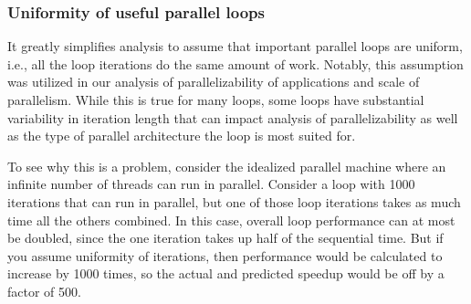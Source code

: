 \documentclass[12pt,twoside]{reedthesis}
\begin{document}
		
		
		
		
		
		

		
		\subsubsection{Uniformity of useful parallel loops}
		
		It greatly simplifies analysis to assume that important parallel loops are uniform, i.e., all the loop iterations do the same amount of work. Notably, this assumption was utilized in our analysis of parallelizability of applications and scale of parallelism. While this is true for many loops, some loops have substantial variability in iteration length that can impact analysis of parallelizability as well as the type of parallel architecture the loop is most suited for. 
			
		To see why this is a problem, consider the idealized parallel machine where an infinite number of threads can run in parallel. Consider a loop with 1000 iterations that can run in parallel, but one of those loop iterations takes as much time all the others combined. In this case, overall loop performance can at most be doubled, since the one iteration takes up half of the sequential time. But if you assume uniformity of iterations, then performance would be calculated to increase by 1000 times, so the actual and predicted speedup would be off by a factor of 500. %
		
\end{document}
